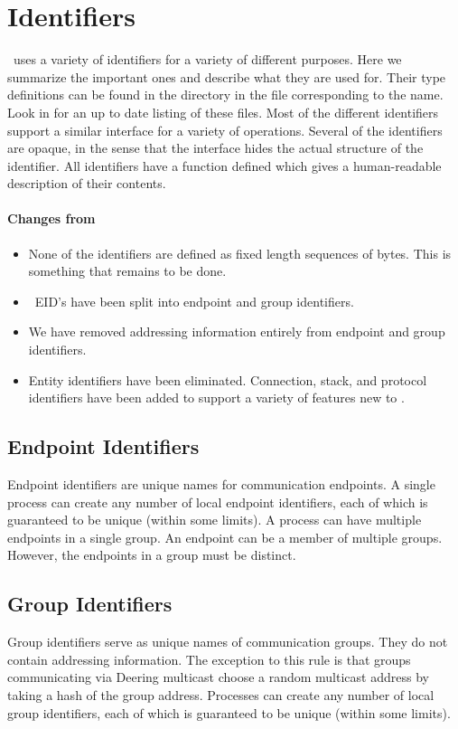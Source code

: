 \section{Identifiers}

\ensemble\ uses a variety of identifiers for a variety of different purposes.  Here
we summarize the important ones and describe what they are used for.  Their type
definitions can be found in the  directory in the file corresponding
to the name.  Look in  for an up to date listing of these files.
Most of the different identifiers support a similar interface for a variety of
operations.  Several of the identifiers are opaque, in the sense that the interface
hides the actual structure of the identifier.  All identifiers have a
 function defined which gives a human-readable description of
their contents.

\paragraph{Changes from \horus}
\begin{itemize}
\item
None of the identifiers are defined as fixed length sequences of bytes.  This is
something that remains to be done.
\item
\horus\ EID's have been split into endpoint and group identifiers.
\item
We have removed addressing information entirely from endpoint and group identifiers.
\item
Entity identifiers have been eliminated.  Connection, stack, and protocol identifiers
have been added to support a variety of features new to \ensemble.
\end{itemize}

\subsection{Endpoint Identifiers}
Endpoint identifiers are unique names for communication endpoints.  A single
process can create any number of local endpoint identifiers, each of which is
guaranteed to be unique (within some limits).  A process can have multiple
endpoints in a single group.  An endpoint can be a member of multiple groups.
However, the endpoints in a group must be distinct.

\subsection{Group Identifiers}
Group identifiers serve as unique names of communication groups.  They do not contain
addressing information.  The exception to this rule is that groups communicating via
Deering multicast choose a random multicast address by taking a hash of the group
address.  Processes can create any number of local group identifiers, each of which
is guaranteed to be unique (within some limits).

